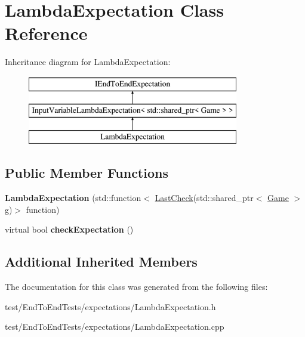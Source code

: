\hypertarget{classLambdaExpectation}{}\section{Lambda\+Expectation Class Reference}
\label{classLambdaExpectation}
Inheritance diagram for Lambda\+Expectation\+:\begin{figure}[H]
\begin{center}
\leavevmode
\includegraphics[height=3.000000cm]{classLambdaExpectation}
\end{center}
\end{figure}
\subsection*{Public Member Functions}
\begin{DoxyCompactItemize}
\item 
{\bfseries Lambda\+Expectation} (std\+::function$<$ \hyperlink{structLastCheck}{Last\+Check}(std\+::shared\+\_\+ptr$<$ \hyperlink{classGame}{Game} $>$ g)$>$ function)\hypertarget{classLambdaExpectation_afc5efaaf9cce454da82c604e3cf5a81c}{}\label{classLambdaExpectation_afc5efaaf9cce454da82c604e3cf5a81c}

\item 
virtual bool {\bfseries check\+Expectation} ()\hypertarget{classLambdaExpectation_a7ee3792d7c4f2f00e0cd7b1cdfd2c6d3}{}\label{classLambdaExpectation_a7ee3792d7c4f2f00e0cd7b1cdfd2c6d3}

\end{DoxyCompactItemize}
\subsection*{Additional Inherited Members}


The documentation for this class was generated from the following files\+:\begin{DoxyCompactItemize}
\item 
test/\+End\+To\+End\+Tests/expectations/Lambda\+Expectation.\+h\item 
test/\+End\+To\+End\+Tests/expectations/Lambda\+Expectation.\+cpp\end{DoxyCompactItemize}
